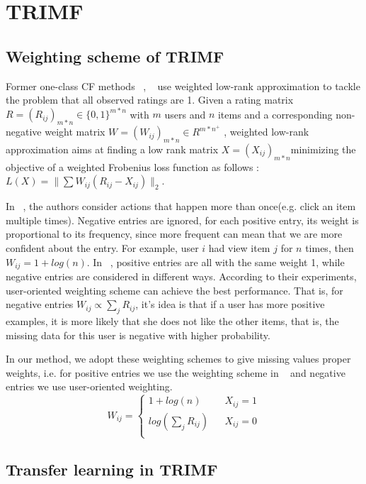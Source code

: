\section{TRIMF}
\subsection{Weighting scheme of TRIMF}
  \par{Former one-class CF methods ~\cite{4781121}, ~\cite{4781145} use weighted low-rank approximation to tackle the problem that all observed ratings are 1. Given a rating matrix $R = (R_{ij})_{m*n} \in \{0, 1\}^{m*n}$ with $m$ users and $n$ items and a corresponding non-negative weight matrix $W = (W_{ij})_{m*n} \in R^{m*n^+}$ , weighted low-rank approximation aims at finding a low rank matrix $X = (X_{ij})_{m*n} $minimizing the objective of a weighted Frobenius loss function as follows : $L(X) = \|\sum W_{ij}(R_{ij} - X_{ij})\|_2$. 

In ~\cite{4781121}, the authors consider actions that happen more than once(e.g. click an item multiple times). Negative entries are ignored, for each positive entry, its weight is proportional to its frequency, since more frequent can mean that we are more confident about the entry. For example, user $i$ had view item $j$ for $n$ times, then $W_{ij} = 1 + log(n)$. In ~\cite{4781145}, positive entries are all with the same weight 1, while negative entries are considered in different ways. According to their experiments, user-oriented weighting scheme can achieve the best performance. That is, for negative entries $W_{ij} \propto \sum_j{R_{ij}}$, it's idea is that if a user has more positive examples, it is more likely that she does not like the other items, that is, the missing data for this user is negative with higher probability.

In our method, we adopt these weighting schemes to give missing values proper weights, i.e. for positive entries we use the weighting scheme in ~\cite{4781121} and negative entries we use user-oriented weighting. $$ W_{ij}=\left\{
\begin{aligned}
1 + log(n) & & X_{ij} = 1\\
log(\sum_j{R_{ij}}) &  & X_{ij} = 0 \\
\end{aligned}
\right.
$$}
\subsection{Transfer learning in TRIMF}

